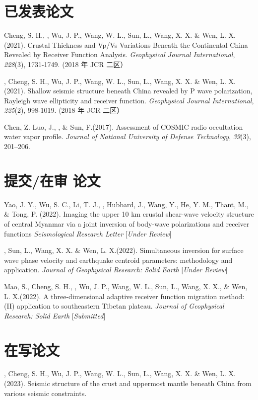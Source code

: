 \newcommand{\Revision}{\textit{under revision}}
\newcommand{\CS}{*} %
\newcommand{\CF}{\textsuperscript{\#}} %


\section*{已发表论文}

\begin{etaremune}
\item
    Cheng, S. H., \Xiao, Wu, J. P., Wang, W. L., Sun, L., Wang, X. X. \& Wen, L. X.(2021).
    Crustal Thickness and Vp/Vs Variations Beneath the Continental China Revealed by Receiver Function Analysis.
    \textit{Geophysical Journal International}, \textit{228}(3), 1731-1749.  (2018 年 JCR 二区）
\item
    \Xiao, Cheng, S. H., Wu, J. P., Wang, W. L., Sun, L., Wang, X. X. \& Wen, L. X.(2021).
    Shallow seismic structure beneath China revealed by P wave polarization, Rayleigh wave ellipticity and receiver function.
    \textit{Geophysical Journal International}, \textit{225}(2), 998-1019.  (2018 年 JCR 二区）
\item
    Chen, Z. Luo, J.,  \Xiao, \& Sun, F.(2017).
    Assessment of COSMIC radio occultation water vapor profile.
    \textit{Journal of National University of Defense Technology}, \textit{39}(3), 201--206. 
\end{etaremune}

\section*{提交/在审 论文}
\begin{etaremune}
\item
    Yao, J. Y., Wu, S. C., Li, T. J., \Xiao, Hubbard, J., Wang, Y., He, Y. M., Thant, M., \& Tong, P. (2022).
    Imaging the upper 10 km crustal shear-wave velocity structure of central Myanmar via a joint inversion of body-wave polarizations and receiver functions
    \textit{Seismological Research Letter} [\textit{Under Review}]
\item
    \Xiao, Sun, L., Wang, X. X. \& Wen, L. X.(2022).
    Simultaneous inversion for surface wave phase velocity and earthquake centroid parameters: methodology and application.
    \textit{Journal of Geophysical Research: Solid Earth} [\textit{Under Review}]
\item
    Mao, S., Cheng, S. H., \Xiao, Wu, J. P., Wang, W. L., Sun, L., Wang, X. X., \& Wen, L. X.(2022).
    A three-dimensional adaptive receiver function migration method: (II) application to southeastern Tibetan plateau.
    \textit{Journal of Geophysical Research: Solid Earth} [\textit{Submitted}]
\end{etaremune}

\section*{在写论文}
\begin{etaremune}
\item
    \Xiao, Cheng, S. H., Wu, J. P., Wang, W. L., Sun, L., Wang, X. X. \& Wen, L. X.(2023).
    Seismic structure of the crust and uppermost mantle beneath China from various seismic constraints.
\end{etaremune}

